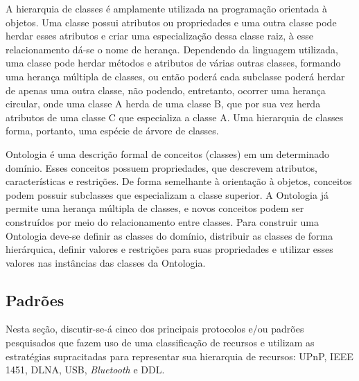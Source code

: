 A hierarquia de classes é amplamente utilizada na programação orientada à objetos. Uma classe possui atributos ou propriedades e uma outra classe pode herdar esses atributos e criar uma especialização dessa classe raiz, à esse relacionamento dá-se o nome de herança. Dependendo da linguagem utilizada, uma classe pode herdar métodos e atributos de várias outras classes, formando uma herança múltipla de classes, ou então poderá cada subclasse poderá herdar de apenas uma outra classe, não podendo, entretanto, ocorrer uma herança circular, onde uma classe A herda de uma classe B, que por sua vez herda atributos de uma classe C que especializa a classe A. Uma hierarquia de classes forma, portanto, uma espécie de árvore de classes.

Ontologia é uma descrição formal de conceitos (classes) em um determinado domínio. Esses conceitos possuem propriedades, que descrevem atributos, características e restrições. De forma semelhante à orientação à objetos, conceitos podem possuir subclasses que especializam a classe superior. A Ontologia já permite uma herança múltipla de classes, e novos conceitos podem ser construídos por meio do relacionamento entre classes. Para construir uma Ontologia deve-se definir as classes do domínio, distribuir as classes de forma hierárquica, definir valores e restrições para suas propriedades e utilizar esses valores nas instâncias das classes da Ontologia. 

\subsection{Padrões}

Nesta seção, discutir-se-á cinco dos principais protocolos e/ou padrões pesquisados que fazem uso de uma classificação de recursos e utilizam as estratégias supracitadas para representar sua hierarquia de recursos: UPnP, IEEE 1451, DLNA, USB, \emph{Bluetooth} e DDL.

